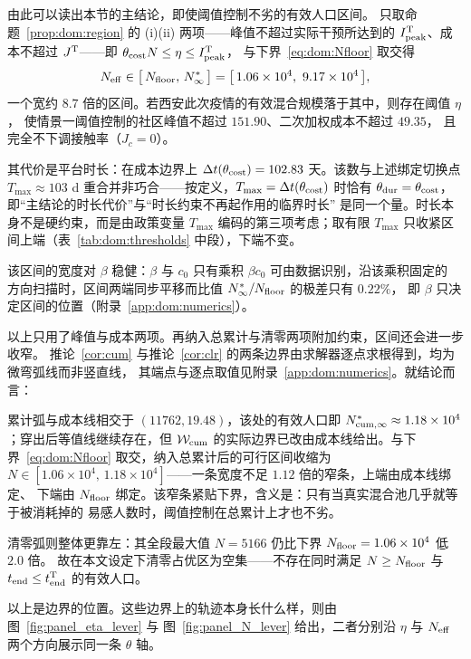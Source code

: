 \documentclass[lang=cn,a4paper,newtx]{elegantpaper}
\numberwithin{equation}{section}
\theoremstyle{plain}
\begin{document}
由此可以读出本节的主结论，即使阈值控制不劣的有效人口区间。
只取命题~\ref{prop:dom:region} 的 (i)(ii) 两项——峰值不超过实际干预所达到的
$I_{\rm peak}^{\rm T}$、成本不超过 $J^{\rm T}$——即 $\theta_{\rm cost}N\le\eta\le I_{\rm peak}^{\rm T}$，
与下界~\eqref{eq:dom:Nfloor} 取交得
\begin{equation}
  N_{\rm eff}\in\bigl[\,N_{\rm floor},\,N^\ast_\infty\,\bigr]
  =\bigl[\,1.06\times10^{4},\ 9.17\times10^{4}\,\bigr],
  \label{eq:dom:main-interval}
\end{equation}
一个宽约 $8.7$ 倍的区间。若西安此次疫情的有效混合规模落于其中，则存在阈值 $\eta$，
使情景一阈值控制的社区峰值不超过 $151.90$、二次加权成本不超过 $49.35$，
且完全不下调接触率（$J_c=0$）。

其代价是平台时长：在成本边界上 $\Delta t(\theta_{\rm cost})=102.83$ 天。该数与上述绑定切换点
$T_{\max}\approx103$ d 重合并非巧合——按定义，$T_{\max}=\Delta t(\theta_{\rm cost})$ 时恰有
$\theta_{\rm dur}=\theta_{\rm cost}$，即“主结论的时长代价”与“时长约束不再起作用的临界时长”
是同一个量。时长本身不是硬约束，而是由政策变量 $T_{\max}$ 编码的第三项考虑；取有限 $T_{\max}$
只收紧区间上端（表~\ref{tab:dom:thresholds} 中段），下端不变。

该区间的宽度对 $\beta$ 稳健：$\beta$ 与 $c_0$ 只有乘积 $\beta c_0$ 可由数据识别，沿该乘积固定的
方向扫描时，区间两端同步平移而比值 $N^\ast_\infty/N_{\rm floor}$ 的极差只有 $0.22\%$，
即 $\beta$ 只决定区间的位置（附录~\ref{app:dom:numerics}）。

以上只用了峰值与成本两项。再纳入总累计与清零两项附加约束，区间还会进一步收窄。
推论~\ref{cor:cum} 与推论~\ref{cor:clr} 的两条边界由求解器逐点求根得到，均为微弯弧线而非竖直线，
其端点与逐点取值见附录~\ref{app:dom:numerics}。就结论而言：

累计弧与成本线相交于 $(11762,19.48)$，该处的有效人口即
$N_{\rm cum,\infty}^\ast\approx1.18\times10^{4}$；穿出后等值线继续存在，但 $\mathcal{W}_{\rm cum}$
的实际边界已改由成本线给出。与下界~\eqref{eq:dom:Nfloor} 取交，纳入总累计后的可行区间收缩为
$N\in[1.06\times10^{4},\,1.18\times10^{4}]$——一条宽度不足 $1.12$ 倍的窄条，上端由成本线绑定、
下端由 $N_{\rm floor}$ 绑定。该窄条紧贴下界，含义是：只有当真实混合池几乎就等于被消耗掉的
易感人数时，阈值控制在总累计上才也不劣。

清零弧则整体更靠左：其全段最大值 $N=5166$ 仍比下界 $N_{\rm floor}=1.06\times10^{4}$ 低 $2.0$ 倍。
故在本文设定下清零占优区为空集——不存在同时满足 $N\ge N_{\rm floor}$ 与
$t_{\rm end}\le t_{\rm end}^{\rm T}$ 的有效人口。

以上是边界的位置。这些边界上的轨迹本身长什么样，则由图~\ref{fig:panel_eta_lever} 与
图~\ref{fig:panel_N_lever} 给出，二者分别沿 $\eta$ 与 $N_{\rm eff}$ 两个方向展示同一条 $\theta$ 轴。
\end{document}
